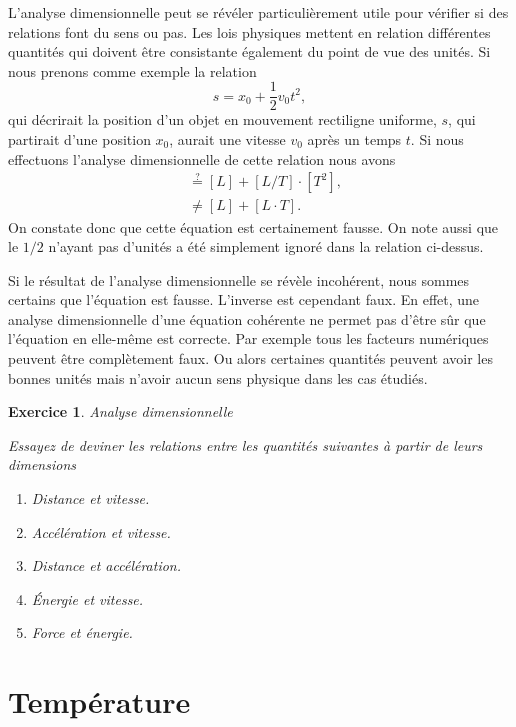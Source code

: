 \documentclass[a4paper,12pt]{book}
\newtheorem{exercice}{Exercice}
\begin{document}
L'analyse dimensionnelle peut se révéler particulièrement utile pour vérifier si des relations font du sens ou pas. Les lois physiques
mettent en relation différentes quantités qui doivent être consistante également du point de vue des unités.
Si nous prenons comme exemple la relation
\begin{equation}
 s=x_0+\frac{1}{2}v_0 t^2,
\end{equation}
qui décrirait la position d'un objet en mouvement rectiligne uniforme, $s$, qui partirait d'une position $x_0$,
aurait une vitesse $v_0$ après un temps $t$. Si nous effectuons l'analyse dimensionnelle de cette relation nous avons
\begin{align}
 [L]&\stackrel{?}{=}[L]+[L/T]\cdot [T^2],\nonumber\\
 &\neq[L]+[L\cdot T].
\end{align}
On constate donc que cette équation est certainement fausse. On note aussi que le $1/2$ n'ayant pas d'unités a été simplement ignoré dans la relation ci-dessus.

Si le résultat de l'analyse dimensionnelle se révèle incohérent, nous sommes certains que l'équation est fausse. 
L'inverse est cependant faux. En effet, une analyse dimensionnelle d'une équation cohérente ne permet pas d'être sûr que l'équation en elle-même est correcte. 
Par exemple tous les facteurs numériques peuvent être complètement faux. Ou alors certaines quantités peuvent avoir les bonnes unités mais n'avoir aucun sens physique dans
les cas étudiés.

\begin{exercice}{Analyse dimensionnelle}

Essayez de deviner les relations entre les quantités suivantes à partir de leurs dimensions
\begin{enumerate}
\item Distance et vitesse.
\item Accélération et vitesse.
\item Distance et accélération.
\item Énergie et vitesse.
\item Force et énergie.
\end{enumerate}

\end{exercice}

\chapter{Température}
\end{document}
